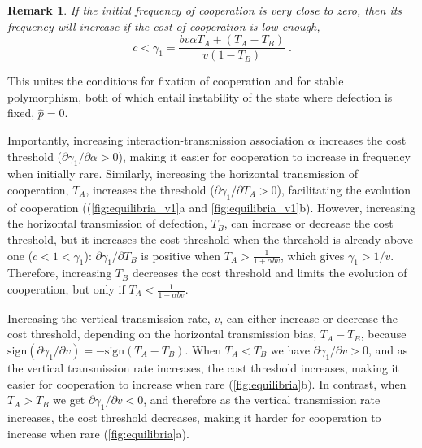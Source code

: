 \documentclass[12pt]{extarticle}
\newtheorem{remark}{Remark}
\begin{document}
\begin{remark}%
\label{remark:rarity}
If the initial frequency of cooperation is very close to zero, then its frequency will increase if the cost of cooperation is low enough,
\begin{equation} \label{eq:unequal_transmission_from_rarity_general_case}
c < \gamma_1 = \frac{b v \alpha T_A + (T_A - T_B)}{v(1-T_B)} \;.
\end{equation} 
\end{remark}

This unites the conditions for fixation of cooperation and for stable polymorphism, both of which entail instability of the state where defection is fixed, $\hat{p}=0$.

Importantly, increasing interaction-transmission association $\alpha$ increases the cost threshold ($\partial \gamma_1 / \partial \alpha > 0$), making it easier for cooperation to increase in frequency when initially rare.
Similarly, increasing the horizontal transmission of cooperation, $T_A$, increases the threshold ($\partial \gamma_1 / \partial T_A > 0$), facilitating the evolution of cooperation ((\autoref{fig:equilibria_v1}a and \ref{fig:equilibria_v1}b).
However, increasing the horizontal transmission of defection, $T_B$, can increase or decrease the cost threshold, but it increases the cost threshold when the threshold is already above one ($c<1<\gamma_1$): $\partial\gamma_1/\partial T_B$ is positive when $T_A > \frac{1}{1+\alpha b v}$, which gives $\gamma_1>1/v$. 
Therefore, increasing $T_B$ decreases the cost threshold and limits the evolution of cooperation, but only if $T_A < \frac{1}{1+\alpha b v}$.

Increasing the vertical transmission rate, $v$, can either increase or decrease the cost threshold, depending on the horizontal transmission bias, $T_A-T_B$, because $\text{sign}(\partial \gamma_1 / \partial v) = -\text{sign}(T_A-T_B)$.
When $T_A<T_B$ we have $\partial \gamma_1 / \partial v >0$, and as the vertical transmission rate increases, the cost threshold increases, making it easier for cooperation to increase when rare (\autoref{fig:equilibria}b). 
In contrast, when $T_A > T_B$ we get $\partial \gamma_1 / \partial v <0$, and therefore as the vertical transmission rate increases, the cost threshold decreases, making it harder for cooperation to increase when rare (\autoref{fig:equilibria}a).
\end{document}
